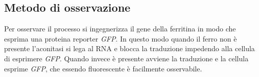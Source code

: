 	\subsection{Metodo di osservazione}
	Per osservare il processo si ingegnerizza il gene della ferritina in modo che esprima una proteina reporter \emph{GFP}.
	In questo modo quando il ferro non \`e presente l'aconitasi si lega al RNA e blocca la traduzione impedendo alla cellula di esprimere \emph{GFP}.
	Quando invece \`e presente avviene la traduzione e la cellula esprime \emph{GFP}, che essendo fluorescente \`e facilmente osservabile.
